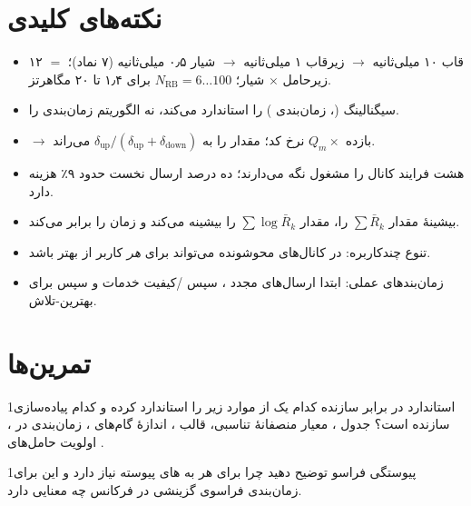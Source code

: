 \documentclass[11pt,a4paper]{article}
\begin{document}
\section{نکته‌های کلیدی}
\begin{takeawaybox}
\begin{itemize}
  \item قاب ۱۰ میلی‌ثانیه $\to$ زیرقاب ۱ میلی‌ثانیه $\to$ شیار ۰٫۵ میلی‌ثانیه (۷ نماد)؛  $=$ ۱۲ زیرحامل
        $\times$ شیار؛ $N_{\mathrm{RB}} = 6\dots100$ برای ۱٫۴ تا ۲۰ مگاهرتز.
  \item {} سیگنالینگ (، زمان‌بندی ) را استاندارد می‌کند، نه الگوریتم زمان‌بندی را.
  \item {} $\to$ بازده $Q_m\times$ نرخ کد؛  مقدار  را به $\delta_{\mathrm{up}}/(\delta_{\mathrm{up}}+\delta_{\mathrm{down}})$ می‌راند.
  \item هشت فرایند  کانال را مشغول نگه می‌دارند؛  ده درصد ارسال نخست حدود ۹٪ هزینه دارد.
  \item بیشینهٔ  مقدار $\sum \bar R_k$ را،  مقدار $\sum\log\bar R_k$ را بیشینه می‌کند و  زمان را برابر می‌کند.
  \item تنوع چندکاربره: در کانال‌های محوشونده  می‌تواند برای \emph{هر} کاربر از  بهتر باشد.
  \item زمان‌بندهای عملی: ابتدا ارسال‌های مجدد ، سپس /کیفیت خدمات و سپس  برای بهترین-تلاش.
\end{itemize}
\end{takeawaybox}

\section{تمرین‌ها}

\begin{exercisebox}{1}{استاندارد در برابر سازنده}\label{exr:std}
کدام یک از موارد زیر را  استاندارد کرده و کدام پیاده‌سازی سازنده است؟ جدول ، معیار منصفانهٔ
تناسبی، قالب ، اندازهٔ گام‌های ، زمان‌بندی  در ، اولویت حامل‌های .
\end{exercisebox}

\begin{exercisebox}{1}{پیوستگی فراسو}\label{exr:contig}
توضیح دهید چرا  برای هر  به های پیوسته نیاز دارد و این برای زمان‌بندی فراسوی گزینشی
در فرکانس چه معنایی دارد.
\end{exercisebox}
\end{document}
